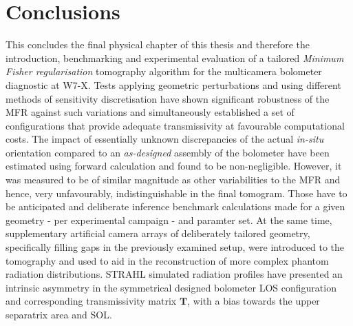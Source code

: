     \section{Conclusions}\label{sec:conclusionschap4}%
%
        This concludes the final physical chapter of this thesis and therefore the introduction, benchmarking and experimental evaluation of a tailored \textit{Minimum Fisher regularisation} tomography algorithm for the multicamera bolometer diagnostic at W7-X. Tests applying geometric perturbations and using different methods of sensitivity discretisation have shown significant robustness of the MFR against such variations and simultaneously established a set of configurations that provide adequate transmissivity at favourable computational costs. The impact of essentially unknown discrepancies of the actual \textit{in-situ} orientation compared to an \textit{as-designed} assembly of the bolometer have been estimated using forward calculation and found to be non-negligible. However, it was measured to be of similar magnitude as other variabilities to the MFR and hence, very unfavourably, indistinguishable in the final tomogram. Those have to be anticipated and deliberate inference benchmark calculations made for a given geometry - per experimental campaign - and paramter set. At the same time, supplementary artificial camera arrays of deliberately tailored geometry, specifically filling gaps in the previously examined setup, were introduced to the tomography and used to aid in the reconstruction of more complex phantom radiation distributions. STRAHL simulated radiation profiles have presented an intrinsic asymmetry in the symmetrical designed bolometer LOS configuration and corresponding transmissivity matrix $\mathbf{T}$, with a bias towards the upper separatrix area and SOL.\\%
